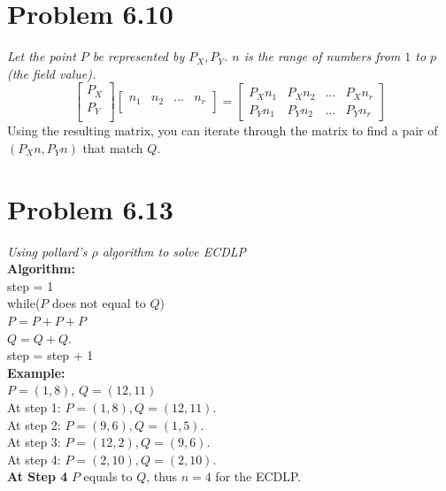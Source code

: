 \documentclass[10pt]{amsart}
\begin{document}
\section*{\small Problem 6.10}
\small \textit{Let the point $P$ be represented by $P_{X}, P_{Y}$. $n$ is the
range of numbers from $1$ to $p$ (the field value).}
\[  \begin{bmatrix}
       P_{X}  \\
       P_{Y}  \\
    \end{bmatrix}
    \begin{bmatrix}
        n_{1} & n_{2} & ... & n_{r}\\
    \end{bmatrix}
    =
    \begin{bmatrix}
       P_{X}n_{1} & P_{X}n_{2} & ... & P_{X}n_{r} \\
       P_{Y}n_{1} & P_{Y}n_{2} & ... & P_{Y}n_{r}
    \end{bmatrix}
\]
Using the resulting matrix, you can iterate through the matrix to find a pair of
$(P_{X}n, P_{Y}n)$ that match $Q$.

\section*{\small Problem 6.13}
\small \textit{Using pollard's $\rho$ algorithm to solve ECDLP} \\
\textbf{Algorithm:} \\
\indent    step = 1 \\
\indent    while($P$ does not equal to $Q$) \\
\indent \indent        $P = P + P + P$ \\
\indent \indent        $Q = Q + Q$. \\
       \indent  step = step + 1 \\

\noindent \textbf{Example:} \\
    $P = (1,8)$,
    $Q = (12,11)$ \\
    At step 1: $P = (1,8), Q = (12,11)$. \\
    At step 2: $P = (9,6), Q = (1,5)$. \\
    At step 3: $P = (12,2), Q = (9,6)$. \\
    At step 4: $P = (2,10), Q = (2,10)$. \\
\noindent \textbf{At Step 4} $P$ equals to $Q$, thus $n = 4$ for the ECDLP.
\end{document}
